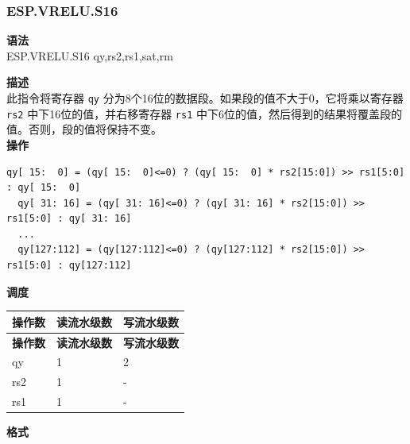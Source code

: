 \newpage

\newpage
\subsubsection{ESP.VRELU.S16}\label{instruction:ESPVRELUS16}
\textbf{语法}\\
ESP.VRELU.S16 qy,rs2,rs1,sat,rm

\textbf{描述}\\
此指令将寄存器 \lstinline{qy} 分为8个16位的数据段。如果段的值不大于0，它将乘以寄存器 \lstinline{rs2} 中下16位的值，并右移寄存器 \lstinline{rs1} 中下6位的值，然后得到的结果将覆盖段的值。否则，段的值将保持不变。\\
\textbf{操作}
\begin{lstlisting}[escapeinside=`?]
  qy[ 15:  0] = (qy[ 15:  0]<=0) ? (qy[ 15:  0] * rs2[15:0]) >> rs1[5:0] : qy[ 15:  0]
  qy[ 31: 16] = (qy[ 31: 16]<=0) ? (qy[ 31: 16] * rs2[15:0]) >> rs1[5:0] : qy[ 31: 16]
  ...
  qy[127:112] = (qy[127:112]<=0) ? (qy[127:112] * rs2[15:0]) >> rs1[5:0] : qy[127:112]
\end{lstlisting}


\textbf{调度}\\
\begin{longtable}[c]{|l|l|l|}
    \hline
    \rowcolor{lightgray}
    \textbf{操作数} & \textbf{读流水级数} & \textbf{写流水级数} \\\hline
    \endfirsthead
    \hline
    \rowcolor{lightgray}
     \textbf{操作数} & \textbf{读流水级数} & \textbf{写流水级数} \\\hline
    \endhead
    \hline
    \endfoot

  qy & 1 & 2 \\\hline
    rs2 & 1 & - \\\hline
    rs1 & 1 & -

\end{longtable}

\textbf{格式}\\

